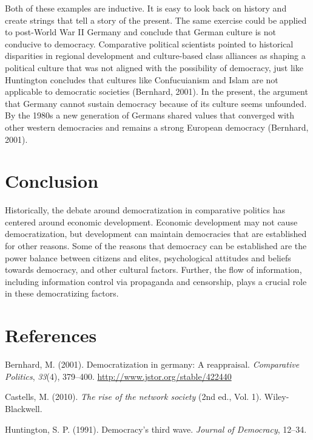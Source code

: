 \documentclass[12pt,]{article}
\begin{document}
Both of these examples are inductive. It is easy to look back on history
and create strings that tell a story of the present. The same exercise
could be applied to post-World War II Germany and conclude that German
culture is not conducive to democracy. Comparative political scientists
pointed to historical disparities in regional development and
culture-based class alliances as shaping a political culture that was
not aligned with the possibility of democracy, just like Huntington
concludes that cultures like Confucuianism and Islam are not applicable
to democratic societies (Bernhard, 2001). In the present, the argument
that Germany cannot sustain democracy because of its culture seems
unfounded. By the 1980s a new generation of Germans shared values that
converged with other western democracies and remains a strong European
democracy (Bernhard, 2001).

\hypertarget{conclusion}{%
\section{Conclusion}\label{conclusion}}

Historically, the debate around democratization in comparative politics
has centered around economic development. Economic development may not
cause democratization, but development can maintain democracies that are
established for other reasons. Some of the reasons that democracy can be
established are the power balance between citizens and elites,
psychological attitudes and beliefs towards democracy, and other
cultural factors. Further, the flow of information, including
information control via propaganda and censorship, plays a crucial role
in these democratizing factors.

\hypertarget{references}{%
\section*{References}\label{references}}

\hypertarget{refs}{}
\leavevmode\hypertarget{ref-bernhard}{}%
Bernhard, M. (2001). Democratization in germany: A reappraisal.
\emph{Comparative Politics}, \emph{33}(4), 379--400.
\url{http://www.jstor.org/stable/422440}

\leavevmode\hypertarget{ref-castells}{}%
Castells, M. (2010). \emph{The rise of the network society} (2nd ed.,
Vol. 1). Wiley-Blackwell.

\leavevmode\hypertarget{ref-huntington}{}%
Huntington, S. P. (1991). Democracy's third wave. \emph{Journal of
Democracy}, 12--34.
\end{document}
